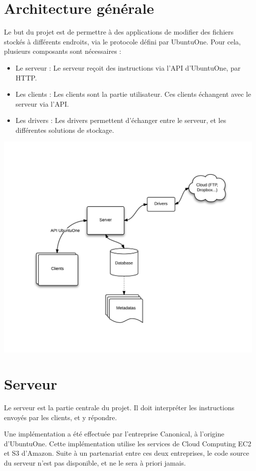 \section{Architecture générale}
Le but du projet est de permettre à des applications de modifier des fichiers stockés à différents endroits, via le protocole défini par UbuntuOne.
Pour cela, plusieurs composants sont nécessaires :
\begin{itemize} 
   \item Le serveur : Le serveur reçoit des instructions via l'API d'UbuntuOne, par HTTP.
   \item Les clients : Les clients sont la partie utilisateur. Ces clients échangent avec le serveur via l'API. 
   \item Les drivers : Les drivers permettent d'échanger entre le serveur, et les différentes solutions de stockage. 
\end{itemize}

\includegraphics[width=500pt]{architecture.png}

\section{Serveur}
Le serveur est la partie centrale du projet. Il doit interpréter les instructions envoyés par les clients, et y répondre.

Une implémentation a été effectuée par l'entreprise Canonical, à l'origine d'UbuntuOne. Cette implémentation utilise les services de Cloud Computing EC2 et S3 d'Amazon. Suite à un partenariat entre ces deux entreprises, le code source du serveur n'est pas disponible, et ne le sera à priori jamais.


